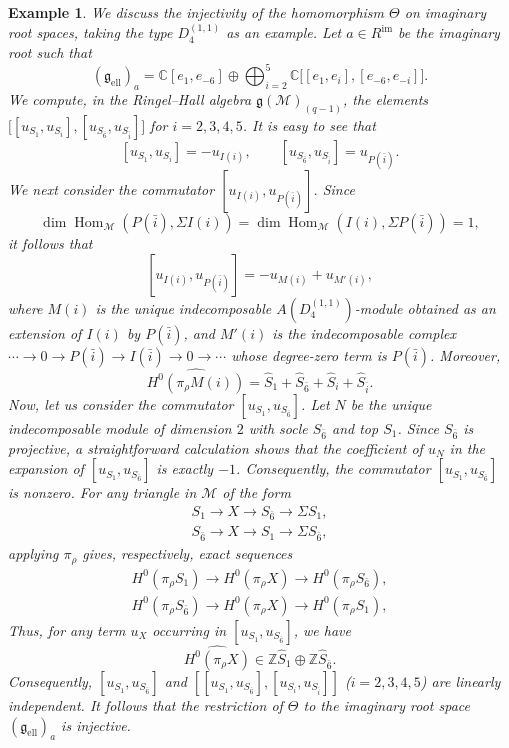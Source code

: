 \documentclass[12pt,reqno]{amsart}
\numberwithin{equation}{section}
\newcommand{\Hom}{\operatorname{Hom}\nolimits}
\renewcommand{\dim}{\operatorname{dim}\nolimits}
\newtheorem{example}[theorem]{Example}
\begin{document}
	\begin{example}
		We discuss the injectivity of the homomorphism $\Theta$ on imaginary
		root spaces, taking the type $D_4^{(1,1)}$ as an example. Let
		$a\in R^{\mathrm{im}}$ be the imaginary root such that
		\[
		(\mathfrak{g}_{\mathrm{ell}})_a
		=
		\mathbb{C}[e_1,e_{-6}]
		\oplus
		\bigoplus_{i=2}^5
		\mathbb{C}\bigl[[e_1,e_i],[e_{-6},e_{-i}]\bigr].
		\]
		We compute, in the Ringel--Hall algebra
		$\mathfrak{g}(\mathcal{M})_{(q-1)}$, the elements
		$\bigl[[u_{S_1},u_{S_{i}}],
		[u_{S_{\bar{6}}},u_{S_{\bar i}}]\bigr]
		$ for $i=2,3,4,5$.
		It is easy to see that
		\[
		[u_{S_1},u_{S_i}]=-u_{I(i)},
		\qquad
		[u_{S_{\bar 6}},u_{S_{\bar i}}]=u_{P(\bar i)}.
		\]
		We next consider the commutator $[u_{I(i)},u_{P(\bar i)}]$. Since
		\[
		\dim\Hom_{\mathcal{M}}(P(\bar i),\Sigma I(i))=\dim \Hom_{\mathcal{M}}(I(i),\Sigma P(\bar i))=1,
		\]
		it follows that
		\[
		[u_{I(i)},u_{P(\bar{i})}]=-u_{M(i)}+u_{M'(i)},
		\]
		where $M(i)$ is the unique
		indecomposable $A(D_4^{(1,1)})$-module obtained as an extension of  $I(i)$ by $P(\bar i)$, and $M'(i)$ is the indecomposable complex $\cdots\rightarrow 0\rightarrow P(\bar i)\rightarrow I(\bar i)\rightarrow 0\rightarrow \cdots$ whose degree-zero term is $P(\bar i)$. Moreover,
		\[
		\widehat{H^0(\pi_\rho M(i))}
		=
		\hat S_1+\hat S_{\bar 6}+\hat S_i+\hat S_{\bar i}.  
		\]
		Now, let us consider the commutator $[u_{S_1}, u_{S_{\bar{6}}}]$. Let $N$ be the unique indecomposable module of dimension $2$ with socle $S_{\bar{6}}$ and top $S_1$. Since $S_{\bar{6}}$ is projective, a straightforward calculation shows that the coefficient of $u_{N}$ in the expansion of $[u_{S_1}, u_{S_{\bar{6}}}]$ is exactly $-1$. Consequently, the commutator $[u_{S_1}, u_{S_{\bar{6}}}]$ is nonzero.
		For any triangle in $\mathcal{M}$ of the form
		\begin{align*}
			S_1 \longrightarrow X \longrightarrow
			S_{\bar 6}\longrightarrow \Sigma S_1, \\
			S_{\bar 6}\longrightarrow X \longrightarrow
			S_1\longrightarrow \Sigma  S_{\bar 6},
		\end{align*}
		applying $\pi_\rho$ gives, respectively, exact sequences
		\begin{align*}
			H^0(\pi_\rho S_1)\longrightarrow H^0(\pi_\rho X)\longrightarrow
			H^0(\pi_\rho  S_{\bar 6}), \\
			H^0(\pi_\rho  S_{\bar 6})\longrightarrow H^0(\pi_\rho X)\longrightarrow
			H^0(\pi_\rho S_1),
		\end{align*}
		Thus, for any term $u_{X}$ occurring in
		$[u_{S_1},u_{S_{\bar 6}}]$, we have
		\[
		\widehat{H^0(\pi_\rho X)}
		\in
		\mathbb{Z}\hat S_1
		\oplus
		\mathbb{Z}\hat S_{\bar 6}.
		\]
		Consequently,
		$[u_{S_1},u_{S_{\bar 6}}]$ and $[[u_{S_1},u_{S_{\bar 6}}], [u_{S_i},u_{S_{\bar i}}]]$ ($i=2,3,4,5$) are linearly independent. It follows that the restriction of $\Theta$
		to the imaginary root space $(\mathfrak{g}_{\mathrm{ell}})_a$ is
		injective.
		

\end{example}
\end{document}
